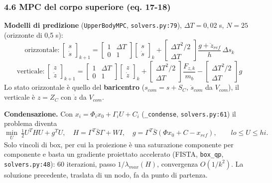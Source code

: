 \documentclass[
]{article}
\begin{document}
\subsubsection{4.6 MPC del corpo superiore (eq. 17-18)}\label{46-mpc-del-corpo-superiore-eq-17-18}

\textbf{Modelli di predizione} (\texttt{UpperBodyMPC}, \texttt{solvers.py:79}), \(\Delta T = 0{,}02\) s, \(N = 25\) (orizzonte di 0,5 s): \[\text{orizzontale:}\ \begin{bmatrix}s\\\dot s\end{bmatrix}_{k+1} = \begin{bmatrix}1&\Delta T\\0&1\end{bmatrix}\begin{bmatrix}s\\\dot s\end{bmatrix}_k + \begin{bmatrix}\Delta T^2/2\\\Delta T\end{bmatrix}\frac{g+\ddot z_{ref}}{h}\,\Delta s_k\] \[\text{verticale:}\ \begin{bmatrix}z\\\dot z\end{bmatrix}_{k+1} = \begin{bmatrix}1&\Delta T\\0&1\end{bmatrix}\begin{bmatrix}z\\\dot z\end{bmatrix}_k + \begin{bmatrix}\Delta T^2/2\\\Delta T\end{bmatrix}\frac{F_{z,k}}{m_b} - \begin{bmatrix}\Delta T^2/2\\\Delta T\end{bmatrix}g\] Lo stato orizzontale è quello del \textbf{baricentro} (\(s_{com} = s + S_C\), \(\dot s_{com}\) da \(V_{com}\)), il verticale è \(z = Z_C\) con \(\dot z\) da \(V_{com}\).

\textbf{Condensazione.} Con \(x_i = \Phi_i x_0 + \Gamma_i U + C_i\) (\texttt{\_condense}, \texttt{solvers.py:61}) il problema diventa \[\min_U\ \tfrac12 U^THU + g^TU,\quad H = \Gamma^T\bar S\Gamma + W I,\quad g = \Gamma^T\bar S(\Phi x_0 + C - x_{ref}),\qquad lo\le U\le hi .\] Solo vincoli di box, per cui la proiezione è una saturazione componente per componente e basta un gradiente proiettato accelerato (FISTA, \texttt{box\_qp}, \texttt{solvers.py:48}): 60 iterazioni, passo \(1/\lambda_{max}(H)\), convergenza \(O(1/k^2)\). La soluzione precedente, traslata di un nodo, fa da punto di partenza.
\end{document}
